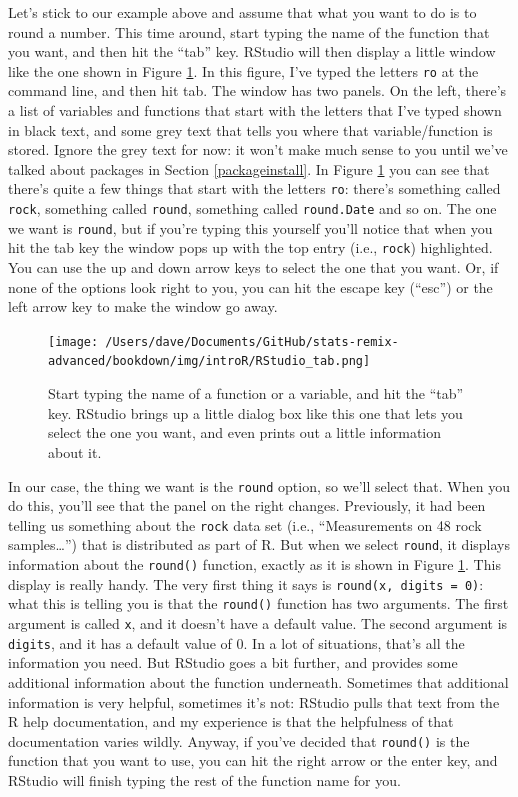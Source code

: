 \documentclass[
]{book}
\begin{document}
Let's stick to our example above and assume that what you want to do is to round a number. This time around, start typing the name of the function that you want, and then hit the ``tab'' key. RStudio will then display a little window like the one shown in Figure \ref{fig:RStudiotab}. In this figure, I've typed the letters \texttt{ro} at the command line, and then hit tab. The window has two panels. On the left, there's a list of variables and functions that start with the letters that I've typed shown in black text, and some grey text that tells you where that variable/function is stored. Ignore the grey text for now: it won't make much sense to you until we've talked about packages in Section \ref{packageinstall}. In Figure \ref{fig:RStudiotab} you can see that there's quite a few things that start with the letters \texttt{ro}: there's something called \texttt{rock}, something called \texttt{round}, something called \texttt{round.Date} and so on. The one we want is \texttt{round}, but if you're typing this yourself you'll notice that when you hit the tab key the window pops up with the top entry (i.e., \texttt{rock}) highlighted. You can use the up and down arrow keys to select the one that you want. Or, if none of the options look right to you, you can hit the escape key (``esc'') or the left arrow key to make the window go away.

\begin{figure}
\centering
\texttt{[image: /Users/dave/Documents/GitHub/stats-remix-advanced/bookdown/img/introR/RStudio\_tab.png]}
\caption{\label{fig:RStudiotab}Start typing the name of a function or a variable, and hit the ``tab'' key. RStudio brings up a little dialog box like this one that lets you select the one you want, and even prints out a little information about it.}
\end{figure}

In our case, the thing we want is the \texttt{round} option, so we'll select that. When you do this, you'll see that the panel on the right changes. Previously, it had been telling us something about the \texttt{rock} data set (i.e., ``Measurements on 48 rock samples\ldots{}'') that is distributed as part of R. But when we select \texttt{round}, it displays information about the \texttt{round()} function, exactly as it is shown in Figure \ref{fig:RStudiotab}. This display is really handy. The very first thing it says is \texttt{round(x,\ digits\ =\ 0)}: what this is telling you is that the \texttt{round()} function has two arguments. The first argument is called \texttt{x}, and it doesn't have a default value. The second argument is \texttt{digits}, and it has a default value of 0. In a lot of situations, that's all the information you need. But RStudio goes a bit further, and provides some additional information about the function underneath. Sometimes that additional information is very helpful, sometimes it's not: RStudio pulls that text from the R help documentation, and my experience is that the helpfulness of that documentation varies wildly. Anyway, if you've decided that \texttt{round()} is the function that you want to use, you can hit the right arrow or the enter key, and RStudio will finish typing the rest of the function name for you.
\end{document}
